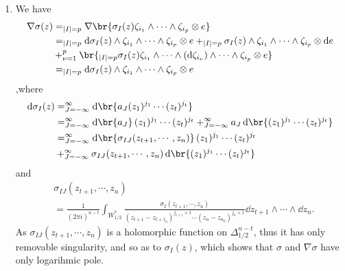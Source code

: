 \documentclass[lang=en,12pt]{beautybook}
\begin{document}
\begin{solution}
\begin{enumerate}
    \item We have {\small\begin{align*}
                \nabla \sigma(z) & =\sum_{\abs{I}=p} \nabla \br{\sigma_I(z) \zeta_{i_1}\wedge\cdots\wedge\zeta_{i_p}\otimes e}                                                                                       \\
                                 & =\sum_{\abs{I}=p} \dd\sigma_I(z) \wedge\zeta_{i_1}\wedge\cdots\wedge\zeta_{i_p}\otimes e+\sum_{\abs{I}=p} \sigma_I(z) \wedge\zeta_{i_1}\wedge\cdots\wedge\zeta_{i_p}\otimes \dd e \\
                                 & + \sum_{\nu=1}^p \br{\sum_{\abs{I}=p} \sigma_I(z) \zeta_{i_1}\wedge\cdots\wedge(\dd\zeta_{i_\nu})\wedge\cdots\wedge\zeta_{i_p}\otimes e}                                          \\
                                 & =\sum_{\abs{I}=p} \dd\sigma_I(z) \wedge\zeta_{i_1}\wedge\cdots\wedge\zeta_{i_p}\otimes e
              \end{align*}}
          ,where \begin{align*}
            \dd\sigma_I(z) & =\sum_{J=-\infty}^{\infty} \dd \br{ a_J (z_1)^{j_1} \cdots (z_t)^{j_t}}                                                                       \\
                           & =\sum_{J=-\infty}^{\infty} \dd \br{a_J } (z_1)^{j_1} \cdots (z_t)^{j_t}+\sum_{J=-\infty}^{\infty} a_J \dd \br{(z_1)^{j_1} \cdots (z_t)^{j_t}} \\
                           & =\sum_{J=-\infty}^{\infty} \dd \br{\sigma_{IJ}(z_{t+1},\cdots,z_n)} (z_1)^{j_1} \cdots (z_t)^{j_t}                                            \\
                           & +\sum_{J=-\infty}^{\infty} \sigma_{IJ}(z_{t+1},\cdots,z_n) \dd \br{(z_1)^{j_1} \cdots (z_t)^{j_t}}
          \end{align*}
          and
          \begin{align*}
             & \sigma_{IJ}(z_{t+1},\cdots,z_n)                                                                                                                                                    \\
             & =\frac{1}{(2\pi i)^{n-t}} \int_{W_{1/2}^*}\frac{\sigma_I(z_{t+1},\cdots,z_n)}{(z_{t+1}-z_{{t+1}_0})^{j_{t+1}+1} \cdots (z_n-z_{n_0})^{j_n+1}}\dd z_{t+1}\wedge\cdots\wedge\dd z_n.
          \end{align*}
          As $\sigma_{IJ}(z_{t+1},\cdots,z_n)$ is a holomorphic function on $\Delta_{1/2}^{n-t}$, thus it has only removable singularity, and so as to $\sigma_I(z)$, which shows that $\sigma$ and $\nabla\sigma$ have only logarihmic pole.


  \end{enumerate}
\end{solution}
\end{document}
